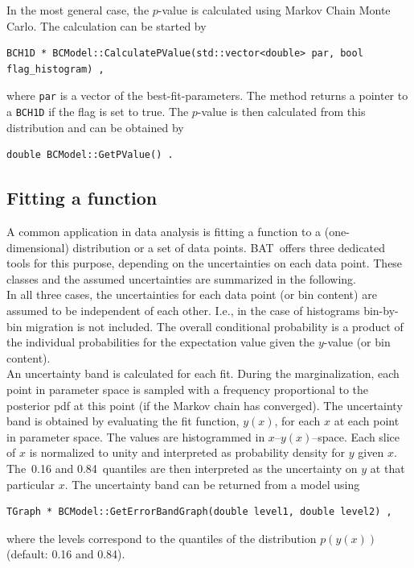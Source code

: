 \documentclass[11pt, a4paper]{article}
\newcommand{\BAT}{{\sc BAT}}
\begin{document}
\noindent 
In the most general case, the $p$-value is calculated using Markov
Chain Monte Carlo. The calculation can be started by 
%
\begin{verbatim}
BCH1D * BCModel::CalculatePValue(std::vector<double> par, bool flag_histogram) , 
\end{verbatim}
%
\noindent 
where \verb|par| is a vector of the best-fit-parameters. The method
returns a pointer to a \verb|BCH1D| if the flag is set to true. The
$p$-value is then calculated from this distribution and can be
obtained by
%
\begin{verbatim}
double BCModel::GetPValue() . 
\end{verbatim} 


\subsection{Fitting a function} 
\label{subsection:fitting}

A common application in data analysis is fitting a function to a
(one-dimensional) distribution or a set of data points. \BAT\ offers
three dedicated tools for this purpose, depending on the uncertainties
on each data point. These classes and the assumed uncertainties are
summarized in the following. \\

\noindent 
In all three cases, the uncertainties for each data point (or bin
content) are assumed to be independent of each other. I.e., in the
case of histograms bin-by-bin migration is not included. The overall
conditional probability is a product of the individual probabilities
for the expectation value given the $y$-value (or bin content). \\

\noindent 
An uncertainty band is calculated for each fit. During the
marginalization, each point in parameter space is sampled with a
frequency proportional to the posterior pdf at this point (if the
Markov chain has converged). The uncertainty band is obtained by
evaluating the fit function, $y(x)$, for each $x$ at each point in
parameter space. The values are histogrammed in
$x$--$y(x)$--space. Each slice of $x$ is normalized to unity and
interpreted as probability density for $y$ given $x$. The~0.16 and
0.84~quantiles are then interpreted as the uncertainty on $y$ at that
particular $x$. The uncertainty band can be returned from a model using 
%
\begin{verbatim}
TGraph * BCModel::GetErrorBandGraph(double level1, double level2) ,  
\end{verbatim}
%
where the levels correspond to the quantiles of the distribution
$p(y(x))$ (default: 0.16 and 0.84). \\
\end{document}
